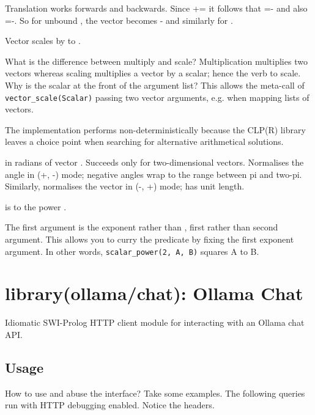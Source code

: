 \begin{description}
Translation works forwards and backwards. Since += it follows
that =- and also =-. So for unbound , the vector becomes -
and similarly for .

Vector  scales by  to .

What is the difference between multiply and scale? Multiplication
multiplies two vectors whereas scaling multiplies a vector by a
scalar; hence the verb to scale. Why is the scalar at the front of
the argument list? This allows the meta-call of \verb$vector_scale(Scalar)$
passing two vector arguments, e.g. when mapping lists of vectors.

The implementation performs non-deterministically because the CLP(R)
library leaves a choice point when searching for alternative
arithmetical solutions.

 in radians of vector . Succeeds only for two-dimensional
vectors. Normalises the  angle in (+, -) mode; negative
angles wrap to the range between pi and two-pi. Similarly,
normalises the vector  in (-, +) mode;  has unit length.

 is  to the power .

The first argument  is the exponent rather than , first rather
than second argument. This allows you to curry the predicate by
fixing the first exponent argument. In other words, \verb$scalar_power(2, A, B)$ squares A to B.
\end{description}

\chapter{library(ollama/chat): Ollama Chat}\label{sec:chat}

Idiomatic SWI-Prolog HTTP client module for interacting with an Ollama
chat API.

\section{Usage}

How to use and abuse the interface? Take some examples. The following
queries run with HTTP debugging enabled. Notice the headers.

